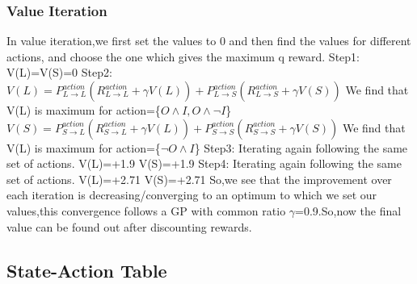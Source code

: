 \documentclass{article}
\begin{document}
\subsubsection{Value Iteration}
In value iteration,we first set the values to 0 and then find the values for different actions, and choose the one which gives the maximum q reward.\newline\newline
Step1: V(L)=V(S)=0\newline\newline
Step2:\newline\newline $V(L)=P_{L\to L}^{action}(R_{L\to L}^{action}+\gamma V(L))+P_{L\to S}^{action}(R_{L\to S}^{action}+\gamma V(S))$\newline\newline
We find that V(L) is maximum for action=\{$O \land I,O \land \neg I$\} \newline\newline
$V(S)=P_{S\to L}^{action}(R_{S\to L}^{action}+\gamma V(L))+P_{S\to S}^{action}(R_{S\to S}^{action}+\gamma V(S))$\newline\newline
We find that V(L) is maximum for action=\{$\neg O \land I$\} \newline\newline
Step3: Iterating again following the same set of actions.\newline\newline
V(L)=+1.9\newline\newline
V(S)=+1.9\newline\newline
Step4: Iterating again following the same set of actions.\newline\newline
V(L)=+2.71\newline\newline
V(S)=+2.71\newline\newline
So,we see that the improvement over each iteration is decreasing/converging to an optimum to which we set our values,this convergence follows a GP with common ratio $\gamma$=0.9.So,now the final value can be found out after discounting rewards.\newline

\subsection{State-Action Table}
\end{document}
